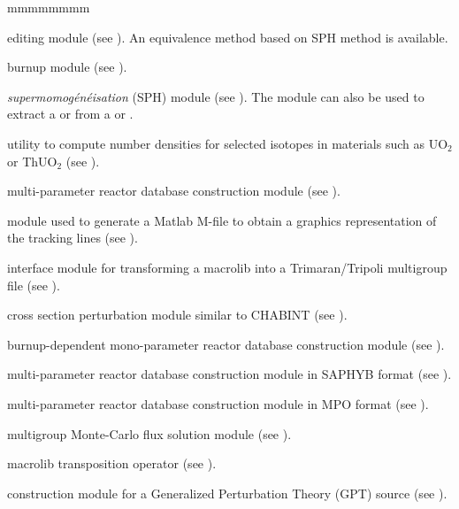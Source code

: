 \begin{ListeDeDescription}{mmmmmmmm}
\item[\moc{EDI:}] editing module (see ). An equivalence method based
on SPH method is available.

\item[\moc{EVO:}] burnup module (see ).

\item[\moc{SPH:}] {\sl supermomog\'en\'eisation} (SPH) module (see ). The 
module can also be used to extract a  or  from a  or .

\item[\moc{INFO:}] utility to compute number densities for selected isotopes in materials such as
UO$_{2}$ or ThUO$_{2}$ (see ).

\item[\moc{COMPO:}] multi-parameter reactor database construction module (see
).

\item[\moc{TLM:}] module used to generate a Matlab M-file to obtain a graphics representation of the  
tracking lines (see ).

\item[\moc{M2T:}] interface module for transforming a macrolib into a Trimaran/Tripoli multigroup file (see ).

\item[\moc{CHAB:}] cross section perturbation module similar to CHABINT (see ).

\item[\moc{CPO:}] burnup-dependent mono-parameter reactor database construction module (see ).

\item[\moc{SAP:}] multi-parameter reactor database construction module in SAPHYB format (see ).

\item[\moc{MPO:}] multi-parameter reactor database construction module in MPO format (see ).

\item[\moc{MC:}] multigroup Monte-Carlo flux solution module (see ).

\item[\moc{T:}] macrolib transposition operator (see ).

\item[\moc{DMAC:}] construction module for a Generalized Perturbation Theory (GPT) source (see ).


\end{ListeDeDescription}
